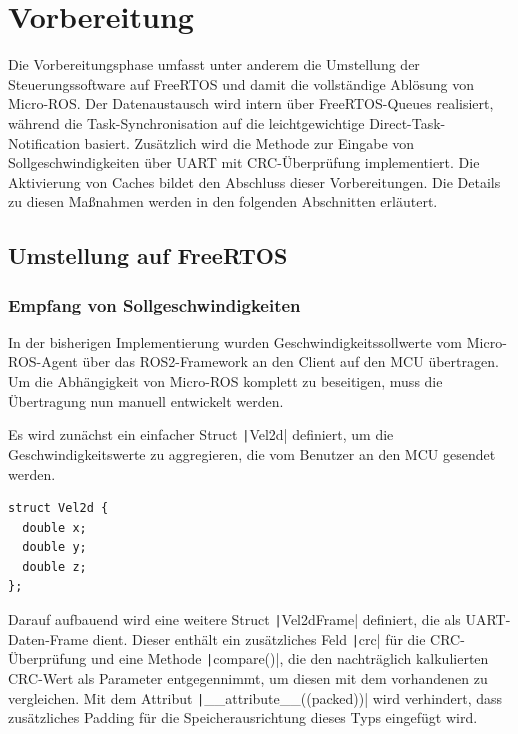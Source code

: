 \section{Vorbereitung}

Die Vorbereitungsphase umfasst unter anderem die Umstellung der
Steuerungssoftware auf FreeRTOS und damit die vollständige Ablösung von
Micro-ROS. Der Datenaustausch wird intern über FreeRTOS-Queues realisiert,
während die Task-Synchronisation auf die leichtgewichtige
Direct-Task-Notification basiert. Zusätzlich wird die Methode zur Eingabe von
Sollgeschwindigkeiten über UART mit CRC-Überprüfung implementiert. Die
Aktivierung von Caches bildet den Abschluss dieser Vorbereitungen. Die Details
zu diesen Maßnahmen werden in den folgenden Abschnitten erläutert.

\subsection{Umstellung auf FreeRTOS}

\subsubsection{Empfang von Sollgeschwindigkeiten}

In der bisherigen Implementierung wurden Geschwindigkeitssollwerte vom
Micro-ROS-Agent über das ROS2-Framework an den Client auf den MCU übertragen. Um
die Abhängigkeit von Micro-ROS komplett zu beseitigen, muss die Übertragung nun
manuell entwickelt werden.

Es wird zunächst ein einfacher Struct \texttt|Vel2d| definiert, um die
Geschwindigkeitswerte zu aggregieren, die vom Benutzer an den MCU gesendet
werden.

\begin{code}
\begin{verbatim}
struct Vel2d {
  double x;
  double y;
  double z;
};
\end{verbatim}
\end{code}

Darauf aufbauend wird eine weitere Struct \texttt|Vel2dFrame|
definiert, die als UART-Daten-Frame dient. Dieser enthält ein zusätzliches Feld
\texttt|crc| für die CRC-Überprüfung und eine Methode
\texttt|compare()|, die den nachträglich kalkulierten CRC-Wert als
Parameter entgegennimmt, um diesen mit dem vorhandenen zu vergleichen. Mit dem
Attribut \linebreak\texttt|__attribute__((packed))| wird verhindert,
dass zusätzliches Padding für die Speicherausrichtung dieses Typs eingefügt
wird.

